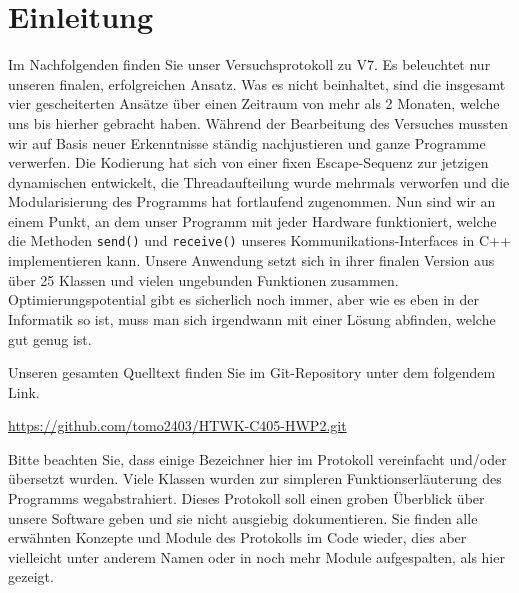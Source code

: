 \chapter{Einleitung}
Im Nachfolgenden finden Sie unser Versuchsprotokoll zu V7. Es beleuchtet nur unseren finalen, erfolgreichen Ansatz. Was es nicht beinhaltet, sind die insgesamt vier gescheiterten Ansätze über einen Zeitraum von mehr als 2 Monaten, welche uns bis hierher gebracht haben. Während der Bearbeitung des Versuches mussten wir auf Basis neuer Erkenntnisse ständig nachjustieren und ganze Programme verwerfen. Die Kodierung hat sich von einer fixen Escape-Sequenz zur jetzigen dynamischen entwickelt, die Threadaufteilung wurde mehrmals verworfen und die Modularisierung des Programms hat fortlaufend zugenommen. Nun sind wir an einem Punkt, an dem unser Programm mit jeder Hardware funktioniert, welche die Methoden \texttt{send()} und \texttt{receive()} unseres Kommunikations-Interfaces in C++ implementieren kann. Unsere Anwendung setzt sich in ihrer finalen Version aus über 25 Klassen und vielen ungebunden Funktionen zusammen. Optimierungspotential gibt es sicherlich noch immer, aber wie es eben in der Informatik so ist, muss man sich irgendwann mit einer Lösung abfinden, welche gut genug ist.

\vspace{1cm}
\noindent
Unseren gesamten Quelltext finden Sie im Git-Repository unter dem folgendem Link.
\begin{tcolorbox}[colback=gray!10,colframe=black,boxrule=0.5pt]
\href{https://github.com/tomo2403/HTWK-C405-HWP2.git}{https://github.com/tomo2403/HTWK-C405-HWP2.git}
\end{tcolorbox}
\vspace{0.5cm}

\noindent
Bitte beachten Sie, dass einige Bezeichner hier im Protokoll vereinfacht und/oder übersetzt wurden. Viele Klassen wurden zur simpleren Funktionserläuterung des Programms wegabstrahiert. Dieses Protokoll soll einen groben Überblick über unsere Software geben und sie nicht ausgiebig dokumentieren. Sie finden alle erwähnten Konzepte und Module des Protokolls im Code wieder, dies aber vielleicht unter anderem Namen oder in noch mehr Module aufgespalten, als hier gezeigt.